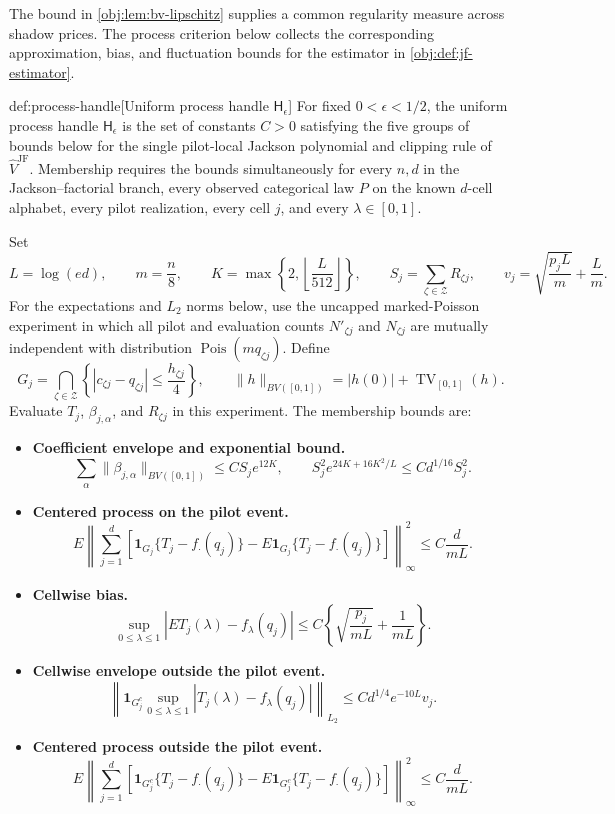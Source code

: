 \documentclass[11pt]{article}
\begin{document}
The bound in \cref{obj:lem:bv-lipschitz} supplies a common regularity measure across shadow prices. The process criterion below collects the corresponding approximation, bias, and fluctuation bounds for the estimator in \cref{obj:def:jf-estimator}.

\begin{definitionv}{def:process-handle}[Uniform process handle $\mathsf H_\epsilon$]
For fixed \(0<\epsilon<1/2\), the uniform process handle \(\mathsf H_\epsilon\) is the set of constants \(C>0\) satisfying the five groups of bounds below for the single pilot-local Jackson polynomial and clipping rule of \(\widehat V^{\mathrm{JF}}\). Membership requires the bounds simultaneously for every \(n,d\) in the Jackson–factorial branch, every observed categorical law \(P\) on the known \(d\)-cell alphabet, every pilot realization, every cell \(j\), and every \(\lambda\in[0,1]\).

Set
\[
L=\log(ed),\qquad
m=\frac n8,\qquad
K=\max\left\{2,\left\lfloor\frac L{512}\right\rfloor\right\},
\qquad
S_j=\sum_{\zeta\in\mathcal Z}R_{\zeta j},
\qquad
v_j=\sqrt{\frac{p_jL}{m}}+\frac Lm.
\]
For the expectations and \(L_2\) norms below, use the uncapped marked-Poisson experiment in which all pilot and evaluation counts \(N'_{\zeta j}\) and \(N_{\zeta j}\) are mutually independent with distribution \(\operatorname{Pois}(m q_{\zeta j})\). Define
\[
G_j
=
\bigcap_{\zeta\in\mathcal Z}
\left\{
|c_{\zeta j}-q_{\zeta j}|
\leq \frac{h_{\zeta j}}4
\right\},
\qquad
\|h\|_{BV([0,1])}
=
|h(0)|+\operatorname{TV}_{[0,1]}(h).
\]
Evaluate \(T_j\), \(\beta_{j,\alpha}\), and \(R_{\zeta j}\) in this experiment. The membership bounds are:
\begin{itemize}
\item \textbf{Coefficient envelope and exponential bound.}
\[
\sum_\alpha\|\beta_{j,\alpha}\|_{BV([0,1])}
\leq C S_j e^{12K},
\qquad
S_j^2 e^{24K+16K^2/L}
\leq C d^{1/16}S_j^2.
\]

\item \textbf{Centered process on the pilot event.}
\[
E\left\|
\sum_{j=1}^d
\left[
\mathbf1_{G_j}\{T_j-f_\cdot(q_j)\}
-
E\mathbf1_{G_j}\{T_j-f_\cdot(q_j)\}
\right]
\right\|_\infty^2
\leq C\frac d{mL}.
\]

\item \textbf{Cellwise bias.}
\[
\sup_{0\leq\lambda\leq1}
\left|ET_j(\lambda)-f_\lambda(q_j)\right|
\leq
C\left\{\sqrt{\frac{p_j}{mL}}+\frac1{mL}\right\}.
\]

\item \textbf{Cellwise envelope outside the pilot event.}
\[
\left\|
\mathbf1_{G_j^c}
\sup_{0\leq\lambda\leq1}
|T_j(\lambda)-f_\lambda(q_j)|
\right\|_{L_2}
\leq
C d^{1/4}e^{-10L}v_j.
\]

\item \textbf{Centered process outside the pilot event.}
\[
E\left\|
\sum_{j=1}^d
\left[
\mathbf1_{G_j^c}\{T_j-f_\cdot(q_j)\}
-
E\mathbf1_{G_j^c}\{T_j-f_\cdot(q_j)\}
\right]
\right\|_\infty^2
\leq C\frac d{mL}.
\]
\end{itemize}
\end{definitionv}
\end{document}
